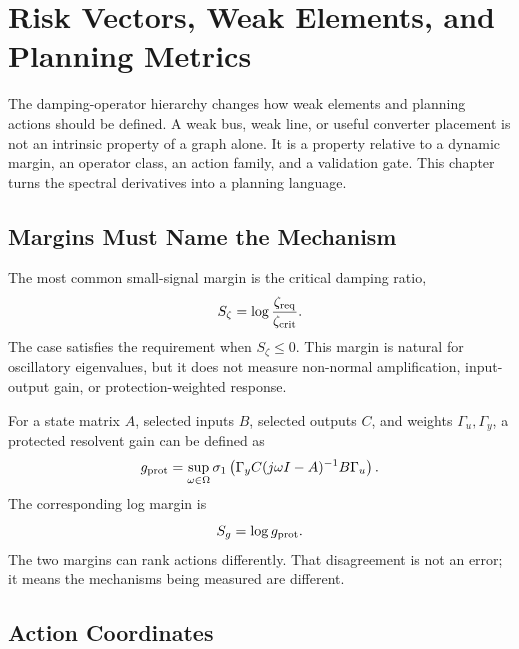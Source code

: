 \chapter{Risk Vectors, Weak Elements, and Planning Metrics}

The damping-operator hierarchy changes how weak elements and planning actions
should be defined. A weak bus, weak line, or useful converter placement is not
an intrinsic property of a graph alone. It is a property relative to a dynamic
margin, an operator class, an action family, and a validation gate. This
chapter turns the spectral derivatives into a planning language.

\section{Margins Must Name the Mechanism}

The most common small-signal margin is the critical damping ratio,
\begin{equation}
  S_\zeta=\log\frac{\zeta_{\rm req}}{\zeta_{\rm crit}}.
  \label{eq:imp_zeta_margin}
\end{equation}
The case satisfies the requirement when \(S_\zeta\le0\). This margin is natural
for oscillatory eigenvalues, but it does not measure non-normal amplification,
input-output gain, or protection-weighted response.

For a state matrix \(A\), selected inputs \(B\), selected outputs \(C\), and
weights \(\Gamma_u,\Gamma_y\), a protected resolvent gain can be defined as
\begin{equation}
  g_{\rm prot}=
  \sup_{\omega\in\Omega}
  \sigma_1\left(\Gamma_yC(j\omega I-A)^{-1}B\Gamma_u\right).
  \label{eq:imp_protected_gain}
\end{equation}
The corresponding log margin is
\begin{equation}
  S_g=\log g_{\rm prot}.
  \label{eq:imp_Sg}
\end{equation}
The two margins can rank actions differently. That disagreement is not an
error; it means the mechanisms being measured are different.

\section{Action Coordinates}

